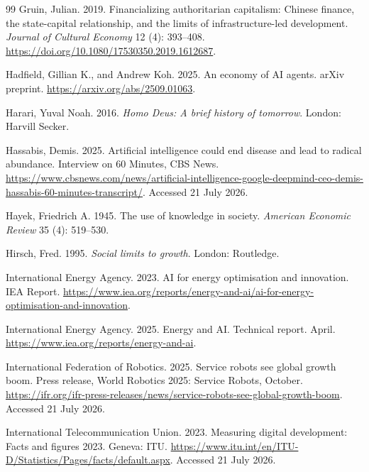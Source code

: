 \documentclass[11pt]{article}
\begin{document}
\begin{thebibliography}{99}
Gruin, Julian. 2019. Financializing authoritarian capitalism: Chinese finance, the state-capital relationship, and the limits of infrastructure-led development. \textit{Journal of Cultural Economy} 12 (4): 393--408. \url{https://doi.org/10.1080/17530350.2019.1612687}.

Hadfield, Gillian K., and Andrew Koh. 2025. An economy of AI agents. arXiv preprint. \url{https://arxiv.org/abs/2509.01063}.

Harari, Yuval Noah. 2016. \textit{Homo Deus: A brief history of tomorrow}. London: Harvill Secker.

Hassabis, Demis. 2025. Artificial intelligence could end disease and lead to radical abundance. Interview on 60 Minutes, CBS News. \url{https://www.cbsnews.com/news/artificial-intelligence-google-deepmind-ceo-demis-hassabis-60-minutes-transcript/}. Accessed 21 July 2026.

Hayek, Friedrich A. 1945. The use of knowledge in society. \textit{American Economic Review} 35 (4): 519--530.

Hirsch, Fred. 1995. \textit{Social limits to growth}. London: Routledge.

International Energy Agency. 2023. AI for energy optimisation and innovation. IEA Report. \url{https://www.iea.org/reports/energy-and-ai/ai-for-energy-optimisation-and-innovation}.

International Energy Agency. 2025. Energy and AI. Technical report. April. \url{https://www.iea.org/reports/energy-and-ai}.

International Federation of Robotics. 2025. Service robots see global growth boom. Press release, World Robotics 2025: Service Robots, October. \url{https://ifr.org/ifr-press-releases/news/service-robots-see-global-growth-boom}. Accessed 21 July 2026.

International Telecommunication Union. 2023. Measuring digital development: Facts and figures 2023. Geneva: ITU. \url{https://www.itu.int/en/ITU-D/Statistics/Pages/facts/default.aspx}. Accessed 21 July 2026.


\end{thebibliography}
\end{document}
